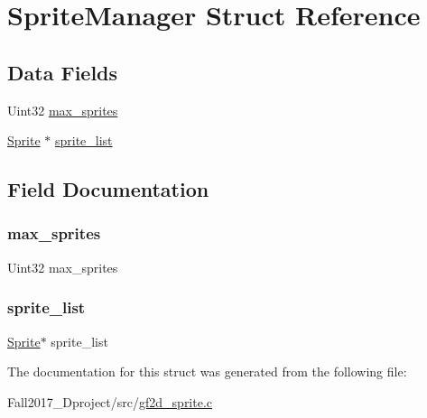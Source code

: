 \hypertarget{struct_sprite_manager}{}\section{Sprite\+Manager Struct Reference}
\label{struct_sprite_manager}
\subsection*{Data Fields}
\begin{DoxyCompactItemize}
\item 
Uint32 \hyperlink{struct_sprite_manager_a5ea83f217d51ae6c72599a9e46e1d947}{max\+\_\+sprites}
\item 
\hyperlink{gf2d__sprite_8h_a85b5a622f08c587d1f33fd504a24416e}{Sprite} $\ast$ \hyperlink{struct_sprite_manager_a73dfacf51622ca4310f07375e16591e1}{sprite\+\_\+list}
\end{DoxyCompactItemize}


\subsection{Field Documentation}
\mbox{\label{struct_sprite_manager_a5ea83f217d51ae6c72599a9e46e1d947}} 
\subsubsection{\texorpdfstring{max\+\_\+sprites}{max\_sprites}}
{\footnotesize\ttfamily Uint32 max\+\_\+sprites}

\mbox{\label{struct_sprite_manager_a73dfacf51622ca4310f07375e16591e1}} 
\subsubsection{\texorpdfstring{sprite\+\_\+list}{sprite\_list}}
{\footnotesize\ttfamily \hyperlink{gf2d__sprite_8h_a85b5a622f08c587d1f33fd504a24416e}{Sprite}$\ast$ sprite\+\_\+list}



The documentation for this struct was generated from the following file\+:\begin{DoxyCompactItemize}
\item 
Fall2017\+\_\+Dproject/src/\hyperlink{gf2d__sprite_8c}{gf2d\+\_\+sprite.\+c}\end{DoxyCompactItemize}
